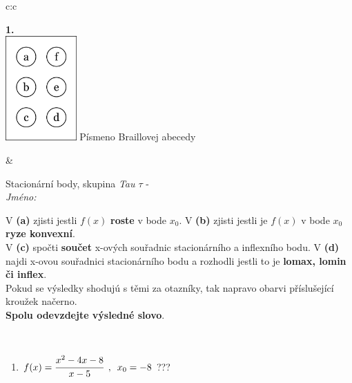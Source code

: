 \documentclass[10pt]{report}
\begin{document}
\begin{tabular}{c:c}
\begin{minipage}[c][104.5mm][t]{0.5\linewidth}
\begin{center}
\begin{minipage}{0.79\linewidth}
\end{minipage}
\begin{minipage}{0.20\linewidth}
\begin{center}
{\Huge\bfseries 1.} \\[2mm]
\includegraphics[height=40mm]{../images/braille.png}
{\small Písmeno Braillovej abecedy}
\end{center}
\end{minipage}
\end{center}
\end{minipage}
&
\begin{minipage}[c][104.5mm][t]{0.5\linewidth}
\begin{center}
\vspace{7mm}
{\huge Stacionární body, skupina \textit{Tau $\tau$} -}\\[5mm]
\textit{Jméno:}\phantom{xxxxxxxxxxxxxxxxxxxxxxxxxxxxxxxxxxxxxxxxxxxxxxxxxxxxxxxxxxxxxxxxx}\\[5mm]
\begin{minipage}{0.95\linewidth}
\begin{center}
{\small V \textbf{(a)} zjisti jestli $f(x)$ \textbf{roste} v bode $x_0$. V \textbf{(b)} zjisti jestli je $f(x)$ v bode $x_0$ \textbf{ryze konvexní}.\\V \textbf{(c)} spočti \textbf{součet} x-ových souřadnic stacionárního a inflexního bodu. V \textbf{(d)} najdi x-ovou souřadnici stacionárního bodu a rozhodli jestli to je \textbf{lomax, lomin či inflex}.\\Pokud se výsledky shodujú s těmi za otazníky, tak napravo obarvi příslušející kroužek načerno.\\\textbf{Spolu odevzdejte výsledné slovo}}.
\end{center}
\end{minipage}
\\[1mm]
\begin{minipage}{0.79\linewidth}
\begin{center}
\begin{varwidth}{\linewidth}
\begin{enumerate}
\normalsize
\item $f(x)=\cfrac{x^2-4x-8}{x-5}\enspace , \enspace x_0=-8$\quad \dotfill\; ???\;\dotfill \quad {}

\end{enumerate}
\end{varwidth}
\end{center}
\end{minipage}
\end{center}
\end{minipage}
\end{tabular}
\end{document}
